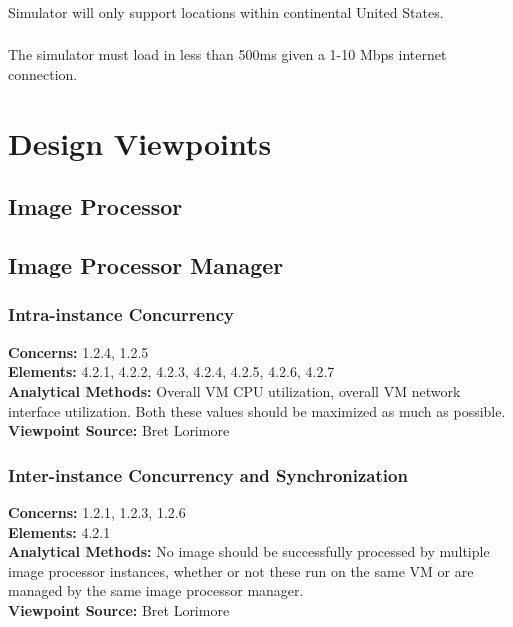 \documentclass[10pt, onecolumn, draftclsnofoot, letterpaper, compsoc]{IEEEtran}
\begin{document}
    \subsubsection{}
    Simulator will only support locations within continental
    United States. \\

    \subsubsection{}
    The simulator must load in less than 500ms given a 1-10
    Mbps internet connection. \\


\section{Design Viewpoints}

\subsection{Image Processor}

\subsection{Image Processor Manager}

    \subsubsection{Intra-instance Concurrency}
    \textbf{Concerns:} 1.2.4, 1.2.5 \\
    \textbf{Elements:} 4.2.1, 4.2.2, 4.2.3, 4.2.4, 4.2.5, 4.2.6, 4.2.7 \\
    \textbf{Analytical Methods:} Overall VM CPU utilization, overall VM network interface utilization. 
    Both these values should be maximized as much as possible. \\
    \textbf{Viewpoint Source:} Bret Lorimore \\

    \subsubsection{Inter-instance Concurrency and Synchronization}
    \textbf{Concerns:} 1.2.1, 1.2.3, 1.2.6 \\
    \textbf{Elements:} 4.2.1 \\
    \textbf{Analytical Methods:} No image should be successfully processed by multiple image processor
    instances, whether or not these run on the same VM or are managed by the same image processor manager. \\
    \textbf{Viewpoint Source:} Bret Lorimore \\
\end{document}
